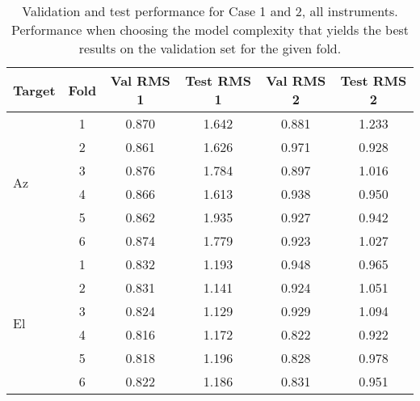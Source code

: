 \begin{table}
    \centering
    \caption{Validation and test performance for Case 1 and 2, all instruments.
    Performance when choosing the model complexity that yields the best results on the validation set for the given fold.}
    \begin{tabular}{lccccc}
        \toprule
        Target & Fold & Val RMS 1 &  Test RMS 1 &  Val RMS 2 &  Test RMS 2 \\
        \midrule
        \multirow{6}{*}{Az} & 1 &  0.870 &       1.642 &      0.881 &       1.233 \\
                            & 2 &  0.861 &       1.626 &      0.971 &       0.928 \\
                            & 3 &  0.876 &       1.784 &      0.897 &       1.016 \\
                            & 4 &  0.866 &       1.613 &      0.938 &       0.950 \\
                            & 5 &  0.862 &       1.935 &      0.927 &       0.942 \\
                            & 6 &  0.874 &       1.779 &      0.923 &       1.027 \\
        \hline
        \multirow{6}{*}{El} & 1 &  0.832 &       1.193 &      0.948 &       0.965 \\
                            & 2 &  0.831 &       1.141 &      0.924 &       1.051 \\
                            & 3 &  0.824 &       1.129 &      0.929 &       1.094 \\
                            & 4 &  0.816 &       1.172 &      0.822 &       0.922 \\
                            & 5 &  0.818 &       1.196 &      0.828 &       0.978 \\
                            & 6 &  0.822 &       1.186 &      0.831 &       0.951 \\
        \bottomrule
    \end{tabular}
\end{table}

